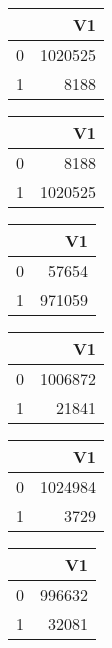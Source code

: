 \bigskip\bigskip
\centering
\begin{tabular}{rr}
  \hline
 & V1 \\ 
  \hline
0 & 1020525 \\ 
  1 & 8188 \\ 
   \hline
\end{tabular}

\bigskip\bigskip
\centering
\begin{tabular}{rr}
  \hline
 & V1 \\ 
  \hline
0 & 8188 \\ 
  1 & 1020525 \\ 
   \hline
\end{tabular}

\bigskip\bigskip
\centering
\begin{tabular}{rr}
  \hline
 & V1 \\ 
  \hline
0 & 57654 \\ 
  1 & 971059 \\ 
   \hline
\end{tabular}

\bigskip\bigskip
\centering
\begin{tabular}{rr}
  \hline
 & V1 \\ 
  \hline
0 & 1006872 \\ 
  1 & 21841 \\ 
   \hline
\end{tabular}

\bigskip\bigskip
\centering
\begin{tabular}{rr}
  \hline
 & V1 \\ 
  \hline
0 & 1024984 \\ 
  1 & 3729 \\ 
   \hline
\end{tabular}

\bigskip\bigskip
\centering
\begin{tabular}{rr}
  \hline
 & V1 \\ 
  \hline
0 & 996632 \\ 
  1 & 32081 \\ 
   \hline
\end{tabular}

